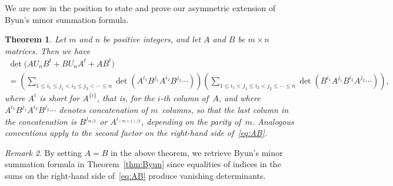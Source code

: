 \documentclass[12pt,reqno]{amsart}
\numberwithin{equation}{section}
\newtheorem{theorem}{Theorem}
\theoremstyle{definition}
\theoremstyle{remark}
\newtheorem{remark}[theorem]{Remark}
\begin{document}
We are now in the position to state and prove our asymmetric extension
of Byun's minor summation formula.

\begin{theorem} \label{thm:AB}
Let $m$ and $n$ be positive integers, and
let $A$ and $B$ be $m\times n$ matrices.
Then we have
\begin{multline} \label{eq:AB}
\det\bigl(AU_nB^t+BU_nA^t+AB^t\bigr)\\
=\left(\sum_{1\le i_1\le j_1<i_2\le j_2<\cdots\le n}
\det(A^{i_1}B^{j_1}A^{i_2}B^{j_2}\cdots)\right)
\left(\sum_{1\le i_1< j_1\le i_2< j_2\le\cdots\le n}
\det(B^{i_1}A^{j_1}B^{i_2}A^{j_2}\cdots)\right),
\end{multline}
where $A^{i}$ is short for $A^{\{i\}}$, that is, for the $i$-th column
of~$A$, and where $A^{i_1}B^{j_1}A^{i_2}B^{j_2}\cdots$ denotes 
concatenation of $m$~columns, so that the last column in the
concatenation is $B^{j_{m/2}}$ or $A^{i_{(m+1)/2}}$, depending on the
parity of~$m$. Analogous conventions apply to the second factor
on the right-hand side of~\eqref{eq:AB}.
\end{theorem}

\begin{remark}
By setting $A=B$ in the above theorem, we retrieve Byun's minor
summation formula in Theorem~\ref{thm:Byun} since equalities of
indices in the sums on the right-hand side of~\eqref{eq:AB} produce
vanishing determinants.
\end{remark}
\end{document}
